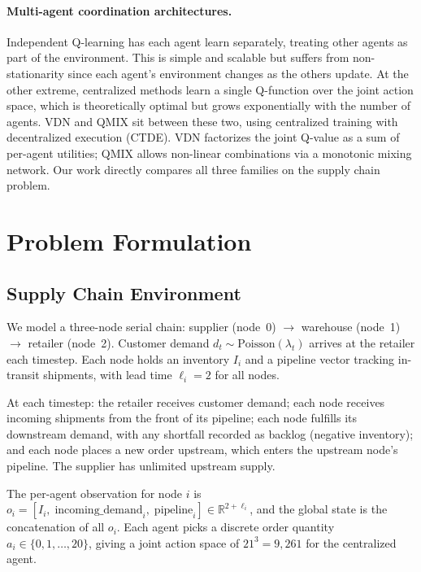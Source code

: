 \documentclass{article}
\begin{document}
\paragraph{Multi-agent coordination architectures.}
Independent Q-learning \cite{tampuu2017multiagent} has each agent learn
separately, treating other agents as part of the environment. This is
simple and scalable but suffers from non-stationarity since each agent's
environment changes as the others update. At the other extreme,
centralized methods learn a single Q-function over the joint action
space, which is theoretically optimal but grows exponentially with the
number of agents. VDN \cite{sunehag2018value} and QMIX
\cite{rashid2018qmix} sit between these two, using centralized training
with decentralized execution (CTDE). VDN factorizes the joint Q-value
as a sum of per-agent utilities; QMIX allows non-linear combinations via
a monotonic mixing network. Our work directly compares all three
families on the supply chain problem.

\section{Problem Formulation}

\subsection{Supply Chain Environment}

We model a three-node serial chain: supplier (node~0) $\to$ warehouse
(node~1) $\to$ retailer (node~2). Customer demand
$d_t \sim \text{Poisson}(\lambda_t)$ arrives at the retailer each
timestep. Each node holds an inventory $I_i$ and a pipeline vector
tracking in-transit shipments, with lead time $\ell_i = 2$ for all
nodes.

At each timestep: the retailer receives customer demand; each node
receives incoming shipments from the front of its pipeline; each node
fulfills its downstream demand, with any shortfall recorded as backlog
(negative inventory); and each node places a new order upstream, which
enters the upstream node's pipeline. The supplier has unlimited upstream
supply.

The per-agent observation for node $i$ is
$o_i = [I_i,\; \text{incoming\_demand}_i,\; \text{pipeline}_i] \in
\mathbb{R}^{2 + \ell_i}$, and the global state is the concatenation
of all $o_i$. Each agent picks a discrete order quantity
$a_i \in \{0, 1, \ldots, 20\}$, giving a joint action space of
$21^3 = 9{,}261$ for the centralized agent.
\end{document}
